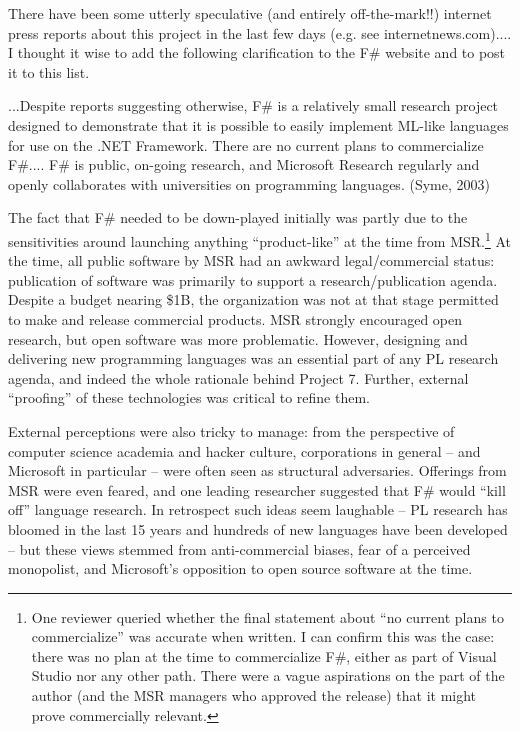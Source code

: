 \documentclass[acmsmall]{acmart}\settopmatter{}
\begin{document}
\begin{verbquote}
There have been some utterly speculative (and entirely off-the-mark!!) internet press reports about this project in the last few days (e.g. see internetnews.com).... I thought it wise to add the following clarification to the F# website and to post it to this list.

...Despite reports suggesting otherwise, F# is a relatively small research project designed to demonstrate that it is possible to easily implement ML-like languages for use on the .NET Framework.  There are no current plans to commercialize F#.... F# is public, on-going research, and Microsoft Research regularly and openly collaborates with universities on programming languages. (Syme, 2003)  
\end{verbquote}

The fact that F\# needed to be down-played initially was partly due to the sensitivities around launching anything “product-like” at the time from MSR.\footnote{One reviewer queried whether the final statement about ``no current plans to commercialize'' was accurate when written.  I can confirm this was the case: there was no plan at the time to commercialize F\#, either as part of Visual Studio nor any other path. There were a vague aspirations on the part of the author (and the MSR managers who approved the release) that it might prove commercially relevant.} At the time, all public software by MSR had an awkward legal/commercial status: publication of software was primarily to support a research/publication agenda. Despite a budget nearing \$1B, the organization was not at that stage permitted to make and release commercial products.  MSR strongly encouraged open research, but open software was more problematic. However, designing and delivering new programming languages was an essential part of any PL research agenda, and indeed the whole rationale behind Project 7.  Further, external “proofing” of these technologies was critical to refine them. 

External perceptions were also tricky to manage: from the perspective of computer science academia and hacker culture, corporations in general – and Microsoft in particular – were often seen as structural adversaries. Offerings from MSR were even feared, and one leading researcher suggested that F\# would “kill off” language research.  In retrospect such ideas seem laughable – PL research has bloomed in the last 15 years and hundreds of new languages have been developed – but these views stemmed from anti-commercial biases, fear of a perceived monopolist, and Microsoft’s opposition to open source software at the time. 
\end{document}
